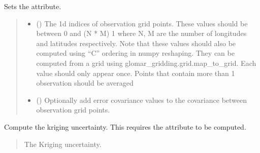 \documentclass[letterpaper,10pt,english]{sphinxmanual}
\begin{document}
\begin{fulllineitems}
\begin{fulllineitems}
\sphinxAtStartPar
Sets the  attribute.
\begin{quote}\begin{description}
\begin{itemize}
\item {}
\sphinxAtStartPar
{} (\sphinxstyleliteralemphasis{\sphinxupquote{{[}}}\sphinxstyleliteralemphasis{\sphinxupquote{{]} }}\sphinxstyleliteralemphasis{\sphinxupquote{| }}\sphinxstyleliteralemphasis{\sphinxupquote{{[}}}\sphinxstyleliteralemphasis{\sphinxupquote{{]}}}) \textendash{} The 1d indices of observation grid points. These values should be
between 0 and (N * M) \sphinxhyphen{} 1 where N, M are the number of longitudes
and latitudes respectively. Note that these values should also be
computed using “C” ordering in numpy reshaping. They can be
computed from a grid using glomar\_gridding.grid.map\_to\_grid. Each
value should only appear once. Points that contain more than 1
observation should be averaged

\item {}
\sphinxAtStartPar
{} (\sphinxstyleliteralemphasis{\sphinxupquote{ | }}) \textendash{} Optionally add error covariance values to the covariance between
observation grid points.

\end{itemize}

\sphinxAtStartPar
{}

\end{description}\end{quote}

\end{fulllineitems}


\begin{fulllineitems}
\label{\detokenize{kriging:glomar_gridding.kriging.SimpleKriging.get_uncertainty}}
\pysigstartsignatures
\pysiglinewithargsret
{}
{}
{}
\pysigstopsignatures
\sphinxAtStartPar
Compute the kriging uncertainty. This requires the attribute
 to be computed.
\begin{quote}\begin{description}
\sphinxAtStartPar
{} \textendash{} The Kriging uncertainty.


\end{description}
\end{quote}
\end{fulllineitems}
\end{fulllineitems}
\end{document}
